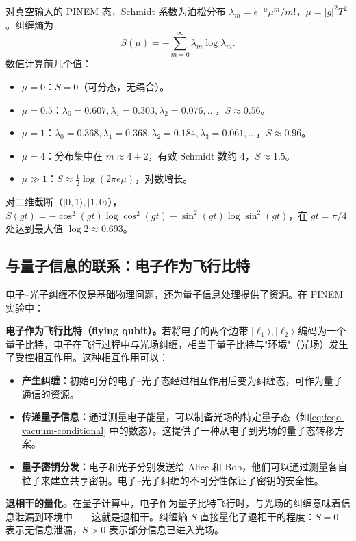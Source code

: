 \begin{workedexample}
对真空输入的 PINEM 态，Schmidt 系数为泊松分布 \(\lambda_m=e^{-\mu}\mu^m/m!\)，\(\mu=|g|^2T^2\)。纠缠熵为
\[
S(\mu)=-\sum_{m=0}^\infty\lambda_m\log\lambda_m.
\]
数值计算前几个值：
\begin{itemize}
\item \(\mu=0\)：\(S=0\)（可分态，无耦合）。
\item \(\mu=0.5\)：\(\lambda_0=0.607,\lambda_1=0.303,\lambda_2=0.076,\ldots\)，\(S\approx0.56\)。
\item \(\mu=1\)：\(\lambda_0=0.368,\lambda_1=0.368,\lambda_2=0.184,\lambda_3=0.061,\ldots\)，\(S\approx0.96\)。
\item \(\mu=4\)：分布集中在 \(m\approx4\pm2\)，有效 Schmidt 数约 4，\(S\approx1.5\)。
\item \(\mu\gg1\)：\(S\approx\frac{1}{2}\log(2\pi e\mu)\)，对数增长。
\end{itemize}
对二维截断（\(|0,1\rangle,|1,0\rangle\)），\(S(gt)=-\cos^2(gt)\log\cos^2(gt)-\sin^2(gt)\log\sin^2(gt)\)，在 \(gt=\pi/4\) 处达到最大值 \(\log 2\approx0.693\)。
\end{workedexample}

\subsection{与量子信息的联系：电子作为飞行比特}

电子--光子纠缠不仅是基础物理问题，还为量子信息处理提供了资源。在 PINEM 实验中：

\textbf{电子作为飞行比特（flying qubit）。}若将电子的两个边带 \(|\ell_1\rangle,|\ell_2\rangle\) 编码为一个量子比特，电子在飞行过程中与光场纠缠，相当于量子比特与"环境"（光场）发生了受控相互作用。这种相互作用可以：

\begin{itemize}
\item \textbf{产生纠缠：}初始可分的电子--光子态经过相互作用后变为纠缠态，可作为量子通信的资源。
\item \textbf{传递量子信息：}通过测量电子能量，可以制备光场的特定量子态（如\cref{eq:feqo-vacuum-conditional} 中的数态）。这提供了一种从电子到光场的量子态转移方案。
\item \textbf{量子密钥分发：}电子和光子分别发送给 Alice 和 Bob，他们可以通过测量各自粒子来建立共享密钥。电子--光子纠缠的不可分性保证了密钥的安全性。
\end{itemize}

\textbf{退相干的量化。}在量子计算中，电子作为量子比特飞行时，与光场的纠缠意味着信息泄漏到环境中——这就是退相干。纠缠熵 \(S\) 直接量化了退相干的程度：\(S=0\) 表示无信息泄漏，\(S>0\) 表示部分信息已进入光场。

